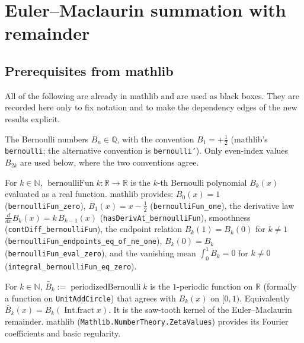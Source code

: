 %

\chapter{Euler--Maclaurin summation with remainder}
\label{cha:euler_maclaurin}

\section{Prerequisites from mathlib}
\label{sec:em_prereqs}

All of the following are already in mathlib and are used as black boxes. They
are recorded here only to fix notation and to make the dependency edges of the
new results explicit.

\begin{definition}
\label{def:bernoulli}
\leanok
The Bernoulli numbers $B_n \in \mathbb{Q}$, with the convention $B_1 = +\tfrac12$
(mathlib's \texttt{bernoulli}; the alternative convention is \texttt{bernoulli'}).
Only even-index values $B_{2k}$ are used below, where the two conventions agree.
\end{definition}

\begin{definition}
\label{def:bernoulliFun}
\leanok
For $k \in \mathbb{N}$, $\operatorname{bernoulliFun} k : \mathbb{R} \to \mathbb{R}$
is the $k$-th Bernoulli polynomial $B_k(x)$ evaluated as a real function. mathlib
provides: $B_0(x) = 1$ (\texttt{bernoulliFun\_zero}), $B_1(x) = x - \tfrac12$
(\texttt{bernoulliFun\_one}), the derivative law
$\frac{d}{dx} B_k(x) = k\,B_{k-1}(x)$ (\texttt{hasDerivAt\_bernoulliFun}),
smoothness (\texttt{contDiff\_bernoulliFun}), the endpoint relation
$B_k(1) = B_k(0)$ for $k \neq 1$ (\texttt{bernoulliFun\_endpoints\_eq\_of\_ne\_one}),
$B_k(0) = B_k$ (\texttt{bernoulliFun\_eval\_zero}), and the vanishing mean
$\int_0^1 B_k = 0$ for $k \neq 0$ (\texttt{integral\_bernoulliFun\_eq\_zero}).
\end{definition}

\begin{definition}
\label{def:periodizedBernoulli}
\leanok
For $k \in \mathbb{N}$, $\widetilde{B_k} := \operatorname{periodizedBernoulli} k$
is the $1$-periodic function on $\mathbb{R}$ (formally a function on
\texttt{UnitAddCircle}) that agrees with $B_k(x)$ on $[0,1)$. Equivalently
$\widetilde{B_k}(x) = B_k(\operatorname{Int.fract} x)$. It is the saw-tooth kernel
of the Euler--Maclaurin remainder. mathlib (\texttt{Mathlib.NumberTheory.ZetaValues})
provides its Fourier coefficients and basic regularity.
\end{definition}


